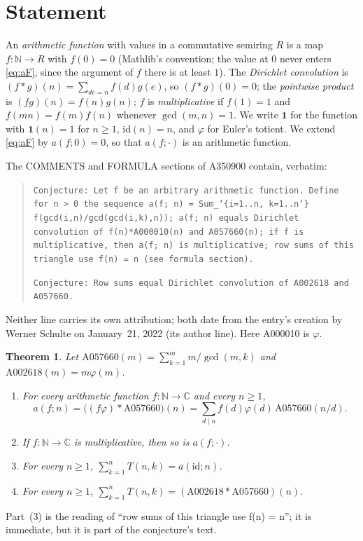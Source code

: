 \documentclass[11pt]{amsart}
\theoremstyle{plain}
\newtheorem{theorem}{Theorem}
\theoremstyle{definition}
\newcommand{\N}{\mathbb{N}}
\newcommand{\C}{\mathbb{C}}
\newcommand{\idf}{\mathrm{id}}
\newcommand{\A}[1]{\mathrm{A#1}}
\begin{document}
\section{Statement}\label{sec:statement}

An \emph{arithmetic function} with values in a commutative semiring $R$ is a map $f\colon\N\to R$ with $f(0)=0$ (Mathlib's convention; the value at $0$ never enters \eqref{eq:aF}, since the argument of $f$ there is at least $1$). The \emph{Dirichlet convolution} is $(f*g)(n)=\sum_{de=n}f(d)g(e)$, so $(f*g)(0)=0$; the \emph{pointwise product} is $(fg)(n)=f(n)g(n)$; $f$ is \emph{multiplicative} if $f(1)=1$ and $f(mn)=f(m)f(n)$ whenever $\gcd(m,n)=1$. We write $\mathbf 1$ for the function with $\mathbf 1(n)=1$ for $n\ge1$, $\idf(n)=n$, and $\varphi$ for Euler's totient. We extend \eqref{eq:aF} by $a(f;0)=0$, so that $a(f;\cdot)$ is an arithmetic function.

The COMMENTS and FORMULA sections of A350900 \cite{A350900} contain, verbatim:
\begin{quote}\footnotesize\raggedright
\texttt{Conjecture: Let f be an arbitrary arithmetic function. Define for n > 0 the sequence a(f; n) = Sum\_\char`\{i=1..n, k=1..n{\char`\}} f(gcd(i,n)/gcd(gcd(i,k),n)); a(f; n) equals Dirichlet convolution of f(n)*A000010(n) and A057660(n); if f is multiplicative, then a(f; n) is multiplicative; row sums of this triangle use f(n) = n (see formula section).}

\texttt{Conjecture: Row sums equal Dirichlet convolution of A002618 and A057660.}
\end{quote}
Neither line carries its own attribution; both date from the entry's creation by Werner Schulte on January~21, 2022 (its author line). Here A000010 is $\varphi$.

\begin{theorem}\label{thm:main}
Let $\A{057660}(m)=\sum_{k=1}^{m}m/\gcd(m,k)$ and $\A{002618}(m)=m\varphi(m)$.
\begin{enumerate}
\item For every arithmetic function $f\colon\N\to\C$ and every $n\ge1$,
\[ a(f;n)=\bigl((f\varphi)*\A{057660}\bigr)(n)=\sum_{d\mid n}f(d)\varphi(d)\,\A{057660}(n/d). \]
\item If $f\colon\N\to\C$ is multiplicative, then so is $a(f;\cdot)$.
\item For every $n\ge1$, $\sum_{k=1}^{n}T(n,k)=a(\idf;n)$.
\item For every $n\ge1$, $\sum_{k=1}^{n}T(n,k)=(\A{002618}*\A{057660})(n)$.
\end{enumerate}
\end{theorem}
Part~(3) is the reading of ``row sums of this triangle use f(n) = n''; it is immediate, but it is part of the conjecture's text.
\end{document}
